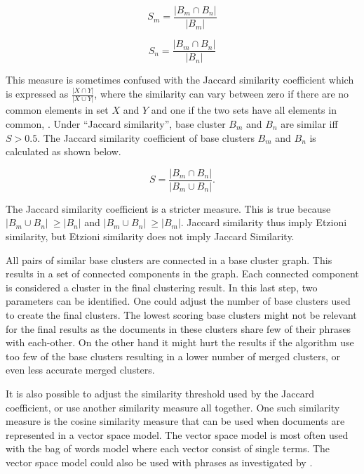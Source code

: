 \begin{displaymath} 
S_{m} = 
\frac{\vert B_{m} \cap B_{n} \vert} {\vert B_{m} \vert}
\end{displaymath}

\begin{displaymath} 
S_{n} = 
\frac{\vert B_{m} \cap B_{n} \vert} {\vert B_{n} \vert}
\end{displaymath}

This measure is sometimes confused with the Jaccard similarity coefficient which is expressed as 
\begin{math}
\frac{\vert X \cap Y \vert} {\vert X \cup Y \vert}
\end{math}, where the similarity can vary between zero if there are no common elements in set \(X\) and \(Y\) and one if the two sets have all elements in common, \parencite{VanRijsbergen1979}. Under ``Jaccard similarity'', base cluster \(B_{m}\) and \(B_{n}\) are similar iff \(S > 0.5\). The Jaccard similarity coefficient of base clusters \(B_{m}\) and \(B_{n}\) is calculated as shown below.

\begin{displaymath} 
S = 
\frac{\vert B_{m} \cap B_{n} \vert} {\vert B_{m} \cup B_{n} \vert}.
\end{displaymath}

The Jaccard similarity coefficient is a stricter measure. This is true because \(\vert B_{m} \cup B_{n} \vert\ \geq \vert B_{n} \vert\) and \(\vert B_{m} \cup B_{n} \vert\ \geq \vert B_{m} \vert\). Jaccard similarity thus imply Etzioni similarity, but Etzioni similarity does not imply Jaccard Similarity.

All pairs of similar base clusters are connected in a base cluster graph. This results in a set of connected components in the graph. Each connected component is considered a cluster in the final clustering result. In this last step, two parameters can be identified. One could adjust the number of base clusters used to create the final clusters. The lowest scoring base clusters might not be relevant for the final results as the documents in these clusters share few of their phrases with each-other. On the other hand it might hurt the results if the algorithm use too few of the base clusters resulting in a lower number of merged clusters, or even less accurate merged clusters.

It is also possible to adjust the similarity threshold used by the Jaccard coefficient, or use another similarity measure all together. One such similarity measure is the cosine similarity measure that can be used when documents are represented in a vector space model. The vector space model is most often used with the bag of words model where each vector consist of single terms. The vector space model could also be used with phrases as investigated by \cite{Chim2007}.

